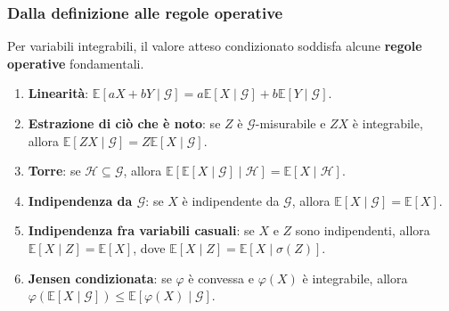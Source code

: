\documentclass[handout]{beamer}%
\newenvironment{stepenumerate}{\begin{enumerate}[<+->]}{\end{enumerate}}
\providecommand{\E}{\mathbb{E}}
\providecommand{\G}{\mathcal{G}}
\providecommand{\1}{\mathbf{1}}
\providecommand{\QTR}[2]{\csname #1\endcsname{#2}}
\begin{document}
\begin{frame}%
%

\frametitle{Dalla definizione alle regole operative}%
%

%


Per variabili integrabili, il valore atteso condizionato soddisfa alcune
\textbf{regole operative} fondamentali.

\medskip



\begin{stepenumerate}
\item[1.] {\small \textbf{Linearit\`{a}}:
$\E[aX+bY\mid\G]=a\E[X\mid\G]+b\E[Y\mid\G]$. }

\item[2.] {\small \textbf{Estrazione di ci\`{o} che \`{e} noto}: se $Z$ \`{e}
$\G$-misurabile e $ZX$ \`{e} integrabile, allora $\E[ZX\mid\G]=Z\E[X\mid\G]$.
}

\item[3.] {\small \textbf{Torre}: se $\mathcal{H}\subseteq\G$, allora
$\E[\E[X\mid\G]\mid\mathcal{H}]=\E[X\mid\mathcal{H}]$. }

\item[4.] {\small \textbf{Indipendenza da $\G$}: se $X$ \`{e} indipendente da
$\G$, allora $\E[X\mid\G]=\E[X]$. }

\item[5.] {\small \textbf{Indipendenza fra variabili casuali}: se $X$ e $Z$
sono indipendenti, allora $\E[X\mid Z]=\E[X]$, dove
$\E[X\mid Z]=\E[X\mid\sigma(Z)]$. }

\item[6.] {\small \textbf{Jensen condizionata}: se $\varphi$ \`{e} convessa e
$\varphi(X)$ \`{e} integrabile, allora $\varphi(\E[X\mid\G])\leq
\E[\varphi(X)\mid\G]$. }
\end{stepenumerate}

%

\transboxout
\end{frame}%
\end{document}
